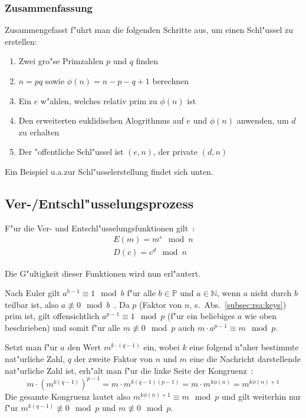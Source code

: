 \documentclass[12pt]{article}
\begin{document}
\subsubsection{Zusammenfassung}

Zusammengefasst f"uhrt man die folgenden Schritte aus, um einen Schl"ussel zu erstellen:

\begin{enumerate}
    \item Zwei gro"se Primzahlen $p$ und $q$ finden
    \item $n = pq$ sowie $\phi(n) = n - p - q + 1$ berechnen
    \item Ein $e$ w"ahlen, welches relativ prim zu $\phi(n)$ ist
    \item Den erweiterten euklidischen Alogrithmus auf $e$ und $\phi(n)$ anwenden, um $d$ zu erhalten
    \item Der "offentliche Schl"ussel ist $(e, n)$, der private $(d, n)$
\end{enumerate}

\noindent
Ein Beispiel u.a.\@ zur Schl"usselerstellung findet sich unten.

\subsection{Ver-/Entschl"usselungsprozess}
F"ur die Ver- und Entschl"usselungsfunktionen gilt~\cite{rsa}:
\[
\begin{aligned}
E(m) = m^e \mod n \\
D(c) = c^d \mod n
\end{aligned}
\]

\noindent
Die G"ultigkeit dieser Funktionen wird nun erl"autert.

Nach Euler gilt $a^{b-1} \equiv 1 \mod b$ f"ur alle $b \in \mathbb{P}$ und $a \in \mathbb{N}$,
wenn $a$ nicht durch $b$ teilbar ist, also $a \not\equiv 0 \mod b$~\cite{euler41}.
Da $p$ (Faktor von $n$, s.~Abs.~\ref{subsec:rsa:keys}) prim ist,
gilt offensichtlich $a^{p-1} \equiv 1 \mod p$
(f"ur ein beliebiges $a$ wie oben beschrieben) und somit f"ur alle $m \not\equiv 0 \mod p$ auch
$m \cdot a^{p-1} \equiv m \mod p$.

Setzt man f"ur $a$ den Wert $m^{k \cdot (q-1)}$ ein,
wobei $k$ eine folgend n"aher bestimmte nat"urliche Zahl, $q$ der zweite Faktor von $n$
und $m$ eine die Nachricht darstellende nat"urliche Zahl ist,
erh"alt man f"ur die linke Seite der Kongruenz~\cite{rsa}:
\[
    m \cdot \left(m^{k(q-1)}\right)^{p-1} = m \cdot m^{k(q-1)(p-1)} = m \cdot m^{k\phi(n)} = m^{k\phi(n) + 1}
\]
Die gesamte Kongruenz lautet also $m^{k\phi(n)+1} \equiv m \mod p$ und
gilt weiterhin nur f"ur $m^{k(q-1)} \not\equiv 0 \mod p$ und $m \not\equiv 0 \mod p$.
\end{document}
